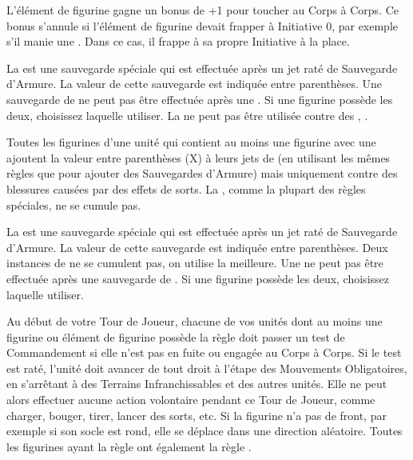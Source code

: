 
L'élément de figurine gagne un bonus de +1 pour toucher au Corps à Corps. Ce bonus s'annule si l'élément de figurine devait frapper à Initiative 0, par exemple s'il manie une \gw{}. Dans ce cas, il frappe à sa propre Initiative à la place.


La \regeneration{} est une sauvegarde spéciale qui est effectuée après un jet raté de Sauvegarde d'Armure. La valeur de cette sauvegarde est indiquée entre parenthèses. Une sauvegarde de \regeneration{} ne peut pas être effectuée après une \wardsave{}. Si une figurine possède les deux, choisissez laquelle utiliser. La \regeneration{} ne peut pas être utilisée contre des \flamingattacks{}, .


Toutes les figurines d'une unité qui contient au moins une figurine avec une \magicresistance{} ajoutent la valeur entre parenthèses (X) à leurs jets de \wardsave{} (en utilisant les mêmes règles que pour ajouter des Sauvegardes d'Armure) mais uniquement contre des blessures causées par des effets de sorts. La \magicresistance{}, comme la plupart des règles spéciales, ne se cumule pas.


La \wardsave{} est une sauvegarde spéciale qui est effectuée après un jet raté de Sauvegarde d'Armure. La valeur de cette sauvegarde est indiquée entre parenthèses. Deux instances de \wardsave{} ne se cumulent pas, on utilise la meilleure. Une \wardsave{} ne peut pas être effectuée après une sauvegarde de \regeneration{}. Si une figurine possède les deux, choisissez laquelle utiliser.


Au début de votre Tour de Joueur, chacune de vos unités dont au moins une figurine ou élément de figurine possède la règle \stupidity{} doit passer un test de Commandement si elle n'est pas en fuite ou engagée au Corps à Corps. Si le test est raté, l'unité doit avancer de  tout droit à l'étape des Mouvements Obligatoires, en s'arrêtant à  des Terrains Infranchissables et des autres unités. Elle ne peut alors effectuer aucune action volontaire pendant ce Tour de Joueur, comme charger, bouger, tirer, lancer des sorts, etc. Si la figurine n'a pas de front, par exemple si son socle est rond, elle se déplace dans une direction aléatoire. Toutes les figurines ayant la règle \stupidity{} ont également la règle \immunetopsychology{}.

